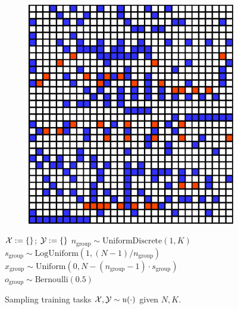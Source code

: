 \begin{figure}
\begin{minipage}[t]{0.35\textwidth}
\begin{figure}[H]
\includegraphics[width=\textwidth]{figs/fdm/training.pdf}
\end{figure}
\end{minipage}
\hfill
\begin{minipage}[t]{0.63\textwidth}
\begin{algorithm}[H]
    \caption{Sampling training tasks $\mathcal{X},\mathcal{Y}\sim u(\cdot)$ given $N,K$.}\label{alg:mask-distribution}
    \label{alg:training-distribution}
    \footnotesize
    \begin{algorithmic}[1]
      \State $\mathcal{X} := \{\}$; $\mathcal{Y} := \{\}$
        \State $n_\text{group} \sim \text{UniformDiscrete}(1, K)$ %
        \State $s_\text{group} \sim \text{LogUniform}(1, (N-1)/n_\text{group})$ %
        \State $x_\text{group} \sim \text{Uniform}(0, N-(n_\text{group}-1)\cdot s_\text{group})$ %
        \State $o_\text{group} \sim \text{Bernoulli}(0.5)$

\end{algorithmic}
\end{algorithm}
\end{minipage}
\end{figure}
